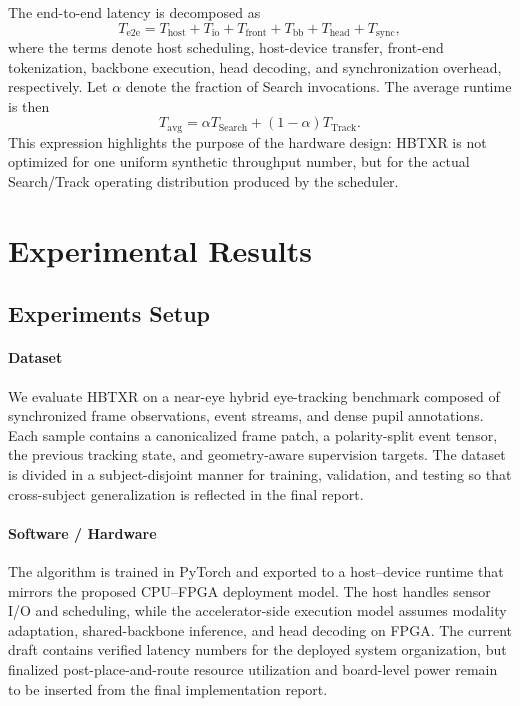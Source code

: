 \documentclass[journal]{IEEEtran}
\begin{document}
The end-to-end latency is decomposed as
\begin{equation}
T_{\mathrm{e2e}} = T_{\mathrm{host}} + T_{\mathrm{io}} + T_{\mathrm{front}} + T_{\mathrm{bb}} + T_{\mathrm{head}} + T_{\mathrm{sync}},
\end{equation}
where the terms denote host scheduling, host-device transfer, front-end tokenization, backbone execution, head decoding, and synchronization overhead, respectively. Let $\alpha$ denote the fraction of Search invocations. The average runtime is then
\begin{equation}
T_{\mathrm{avg}} = \alpha T_{\mathrm{Search}} + (1-\alpha)T_{\mathrm{Track}}.
\end{equation}
This expression highlights the purpose of the hardware design: HBTXR is not optimized for one uniform synthetic throughput number, but for the actual Search/Track operating distribution produced by the scheduler.

\section{Experimental Results}
\subsection{Experiments Setup}
\paragraph*{Dataset}
We evaluate HBTXR on a near-eye hybrid eye-tracking benchmark composed of synchronized frame observations, event streams, and dense pupil annotations. Each sample contains a canonicalized frame patch, a polarity-split event tensor, the previous tracking state, and geometry-aware supervision targets. The dataset is divided in a subject-disjoint manner for training, validation, and testing so that cross-subject generalization is reflected in the final report.

\paragraph*{Software / Hardware}
The algorithm is trained in PyTorch and exported to a host--device runtime that mirrors the proposed CPU--FPGA deployment model. The host handles sensor I/O and scheduling, while the accelerator-side execution model assumes modality adaptation, shared-backbone inference, and head decoding on FPGA. The current draft contains verified latency numbers for the deployed system organization, but finalized post-place-and-route resource utilization and board-level power remain to be inserted from the final implementation report.
\end{document}

